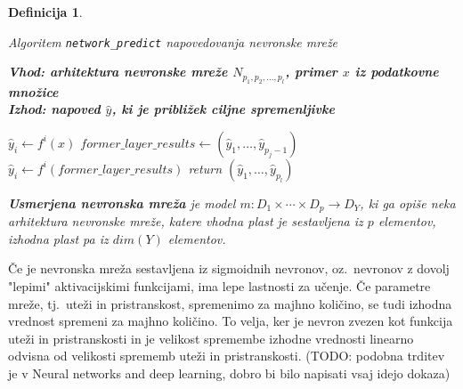 \documentclass[12pt,a4paper]{article}
\newtheorem{definicija}{Definicija}
\begin{document}
\begin{definicija}
\begin{enumerate}
  \begin{algorithm}[ht]
    \caption{Algoritem \texttt{network\_predict} napovedovanja nevronske mreže}
    \label{algoritem-neural-predict}
    \raggedright
    \textbf{Vhod: arhitektura nevronske mreže $N_{p_1,p_2,\ldots,p_l}$, primer $x$ iz podatkovne množice}  \\
    \textbf{Izhod: napoved $\hat{y}$, ki je približek ciljne spremenljivke} 
    \begin{algorithmic}[1]
		\State $\hat{y}_i \gets f^i(x)$
	\EndFor
		\State $\mathit{former\_layer\_results} \gets (\hat{y}_1,\ldots,\hat{y}_{p_j-1})$
			\State $\hat{y}_i \gets f^i(\mathit{former\_layer\_results})$
		\EndFor
	\EndFor
	\State return $(\hat{y}_1,\ldots,\hat{y}_{p_l})$
    \end{algorithmic}
  \end{algorithm}



\end{enumerate}

\textbf{Usmerjena nevronska mreža} je model $m: D_1 \times \cdots \times D_p \rightarrow D_Y$, ki ga opiše neka arhitektura nevronske mreže, 
katere vhodna plast je sestavljena iz $p$ elementov, izhodna plast pa iz $dim(Y)$ elementov.
\end{definicija}

Če je nevronska mreža sestavljena iz sigmoidnih nevronov, oz.~nevronov z dovolj "lepimi" aktivacijskimi funkcijami, ima lepe lastnosti za učenje. 
Če parametre mreže, tj.~uteži in pristranskost, spremenimo za majhno količino, se tudi izhodna vrednost spremeni za majhno količino. 
To velja, ker je nevron zvezen kot funkcija uteži in pristranskosti in je velikost spremembe izhodne vrednosti linearno odvisna od velikosti sprememb uteži in pristranskosti. 
(TODO: podobna trditev je v Neural networks and deep learning, dobro bi bilo napisati vsaj idejo dokaza)
\end{document}
